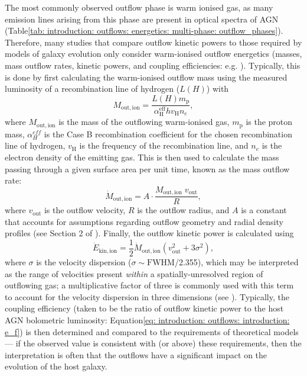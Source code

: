 The most commonly observed outflow phase is warm ionised gas, as many emission lines arising from this phase are present in optical spectra of AGN (Table\;\ref{tab: introduction: outflows: energetics: multi-phase: outflow_phases}). Therefore, many studies that compare outflow kinetic powers to those required by models of galaxy evolution only consider warm-ionised outflow energetics (masses, mass outflow rates, kinetic powers, and coupling efficiencies: e.g. \citealt{Liu2013, Rose2018, Tadhunter2019}). Typically, this is done by first calculating the warm-ionised outflow mass using the measured luminosity of a recombination line of hydrogen ($L(H)$) with
\begin{equation}
    M_\mathrm{out, ion} = \frac{L(H)m_\mathrm{p}}{\alpha^\mathrm{eff}_\mathrm{H}hv_\mathrm{H}n_e},
    \label{eq: introduction: outflows: energetics: mout}
\end{equation}
where $M_\mathrm{out, ion}$ is the mass of the outflowing warm-ionised gas, $m_\mathrm{p}$ is the proton mass, $\alpha^{eff}_{H}$ is the Case B recombination coefficient for the chosen recombination line of hydrogen, $v_\mathrm{H}$ is the frequency of the recombination line, and $n_e$ is the electron density of the emitting gas. This is then used to calculate the mass passing through a given surface area per unit time, known as the mass outflow rate:
\begin{equation}
    \dot{M}_\mathrm{out, ion} = A\cdot\frac{M_\mathrm{out, ion}\;v_\mathrm{out}}{R},
    \label{eq: introduction: outflows: energetics: mout_rate}
\end{equation}
where $v_\mathrm{out}$ is the outflow velocity, $R$ is the outflow radius, and $A$ is a constant that accounts for assumptions regarding outflow geometry and radial density profiles (see Section 2 of \citealt{Veilleux2020}). Finally, the outflow kinetic power is calculated using
\begin{equation}
    \dot{E}_\mathrm{kin, ion} = \frac{1}{2}{\dot{M}_\mathrm{out, ion}(v^2_\mathrm{out} + 3\sigma^2)},
    \label{eq: introduction: outflows: energetics: ekin}
\end{equation}
where $\sigma$ is the velocity dispersion ($\sigma\sim\mathrm{FWHM}$/2.355), which may be interpreted as the range of velocities present \textit{within} a spatially-unresolved region of outflowing gas; a multiplicative factor of three is commonly used with this term to account for the velocity dispersion in three dimensions (see \citealt{Rupke2005b}). Typically, the coupling efficiency (taken to be the ratio of outflow kinetic power to the host AGN bolometric luminosity: Equation\;\ref{eq: introduction: outflows: introduction: e_f}) is then determined and compared to the requirements of theoretical models --- if the observed value is consistent with (or above) these requirements, then the interpretation is often that the outflows have a significant impact on the evolution of the host galaxy.

